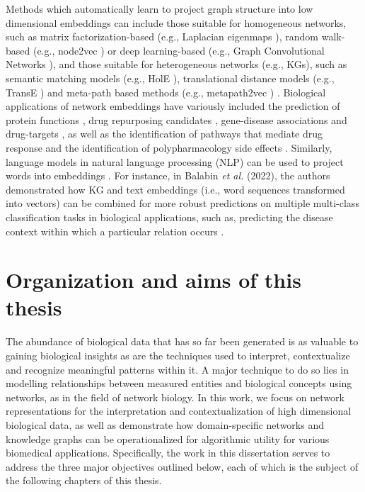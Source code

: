 Methods which automatically learn to project graph structure into low dimensional embeddings can include those suitable for homogeneous networks, such as matrix factorization-based (e.g., Laplacian eigenmaps \parencite{belkin2001}), random walk-based (e.g., node2vec \parencite{grover2016}) or deep learning-based (e.g., Graph Convolutional Networks \parencite{kipf2016}), and those suitable for heterogeneous networks (e.g., KGs), such as semantic matching models (e.g., HolE \parencite{nickel2016}), translational distance models (e.g., TransE \parencite{bordes2013}) and meta-path based methods (e.g., metapath2vec \parencite{dong2017}) \parencite{su2020,nicholson2020}. Biological applications of network embeddings have variously included the prediction of protein functions \parencite{kulmanov2018}, drug repurposing candidates \parencite{ratajczak2022}, gene-disease associations \parencite{peng2019} and drug-targets \parencite{luo2017}, as well as the identification of pathways that mediate drug response \parencite{wang2019} and the identification of polypharmacology side effects \parencite{zitnik2018}. Similarly, language models in natural language processing (NLP) can be used to project words into embeddings \parencite{li2018}. For instance, in Balabin \textit{et al.} (2022), the authors demonstrated how KG and text embeddings (i.e., word sequences transformed into vectors) can be combined for more robust predictions on multiple multi-class classification tasks in biological applications, such as, predicting the disease context within which a particular relation occurs \parencite{balabin2022}.

\section{Organization and aims of this thesis}

The abundance of biological data that has so far been generated is as valuable to gaining biological insights as are the techniques used to interpret, contextualize and recognize meaningful patterns within it. A major technique to do so lies in modelling relationships between measured entities and biological concepts using networks, as in the field of network biology. In this work, we focus on network representations for the interpretation and contextualization of high dimensional biological data, as well as demonstrate how domain-specific networks and knowledge graphs can be operationalized for algorithmic utility for various biomedical applications. Specifically, the work in this dissertation serves to address the three major objectives outlined below, each of which is the subject of the following chapters of this thesis.

